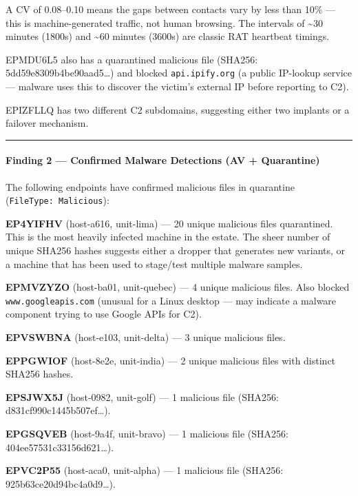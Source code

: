 \documentclass[
]{article}
\begin{document}
A CV of 0.08--0.10 means the gaps between contacts vary by less than
10\% --- this is machine-generated traffic, not human browsing. The
intervals of \textasciitilde30 minutes (1800s) and \textasciitilde60
minutes (3600s) are classic RAT heartbeat timings.

EPMDU6L5 also has a quarantined malicious file (SHA256:
5dd59e8309b4be90aad5\ldots) and blocked \texttt{api.ipify.org} (a public
IP-lookup service --- malware uses this to discover the victim's
external IP before reporting to C2).

EPIZFLLQ has two different C2 subdomains, suggesting either two implants
or a failover mechanism.

\begin{center}\rule{0.5\linewidth}{0.5pt}\end{center}

\paragraph{Finding 2 --- Confirmed Malware Detections (AV +
Quarantine)}\label{finding-2-confirmed-malware-detections-av-quarantine}

The following endpoints have confirmed malicious files in quarantine
(\texttt{FileType:\ Malicious}):

\textbf{EP4YIFHV} (host-a616, unit-lima) --- 20 unique malicious files
quarantined. This is the most heavily infected machine in the estate.
The sheer number of unique SHA256 hashes suggests either a dropper that
generates new variants, or a machine that has been used to stage/test
multiple malware samples.

\textbf{EPMVZYZO} (host-ba01, unit-quebec) --- 4 unique malicious files.
Also blocked \texttt{www.googleapis.com} (unusual for a Linux desktop
--- may indicate a malware component trying to use Google APIs for C2).

\textbf{EPVSWBNA} (host-e103, unit-delta) --- 3 unique malicious files.

\textbf{EPPGWIOF} (host-8e2e, unit-india) --- 2 unique malicious files
with distinct SHA256 hashes.

\textbf{EPSJWX5J} (host-0982, unit-golf) --- 1 malicious file (SHA256:
d831cf990c1445b507ef\ldots).

\textbf{EPGSQVEB} (host-9a4f, unit-bravo) --- 1 malicious file (SHA256:
404ee57531c33156d621\ldots).

\textbf{EPVC2P55} (host-aca0, unit-alpha) --- 1 malicious file (SHA256:
925b63ce20d94bc4a0d9\ldots).
\end{document}
